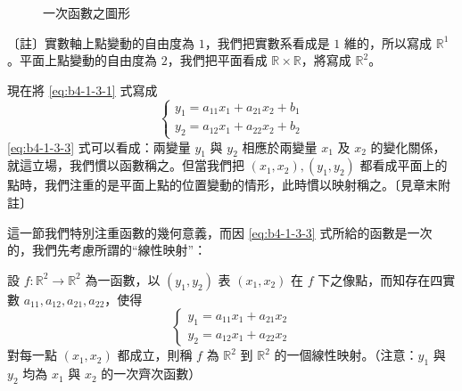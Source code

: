 \begin{figure}[H]
\centering
{}
\caption{一次函數之圖形}
\label{fig:b4-1-3-1}
\end{figure}

〔註〕實數軸上點變動的自由度為 $1$，我們把實數系看成是 $1$ 維的，所以寫成 $\mathbb{R}^1$。平面上點變動的自由度為 $2$，我們把平面看成 $\mathbb{R} \times \mathbb{R}$，將寫成 $\mathbb{R}^2$。

現在將 \eqref{eq:b4-1-3-1} 式寫成
\begin{equation}
\begin{cases}
y_1 = a_{11}x_1 + a_{21}x_2 + b_1 \\
y_2 = a_{12}x_1 + a_{22}x_2 + b_2
\end{cases} \label{eq:b4-1-3-3}
\end{equation}
\eqref{eq:b4-1-3-3} 式可以看成：兩變量 $y_1$ 與 $y_2$ 相應於兩變量 $x_1$ 及 $x_2$ 的變化關係，就這立場，我們慣以函數稱之。但當我們把 $(x_1, x_2), (y_1, y_2)$ 都看成平面上的點時，我們注重的是平面上點的位置變動的情形，此時慣以映射稱之。〔見章末附註〕

這一節我們特別注重函數的幾何意義，而因 \eqref{eq:b4-1-3-3} 式所給的函數是一次的，我們先考慮所謂的“線性映射”：

\begin{definition}[定義]
設 $f: \mathbb{R}^2 \to \mathbb{R}^2$ 為一函數，以 $(y_1, y_2)$ 表 $(x_1, x_2)$ 在 $f$ 下之像點，而知存在四實數 $a_{11}, a_{12}, a_{21}, a_{22}$，使得
\begin{equation}
\begin{cases}
y_1 = a_{11}x_1 + a_{21}x_2 \\
y_2 = a_{12}x_1 + a_{22}x_2
\end{cases} \label{eq:b4-1-3-4}
\end{equation}
對每一點 $(x_1, x_2)$ 都成立，則稱 $f$ 為 $\mathbb{R}^2$ 到 $\mathbb{R}^2$ 的一個線性映射。（注意：$y_1$ 與 $y_2$ 均為 $x_1$ 與 $x_2$ 的一次齊次函數）
\end{definition}

